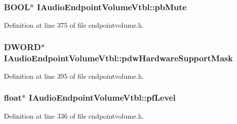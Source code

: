 \subsubsection[{\texorpdfstring{pb\+Mute}{pbMute}}]{ {\bf B\+O\+OL}$\ast$ I\+Audio\+Endpoint\+Volume\+Vtbl\+::pb\+Mute}\hypertarget{struct_i_audio_endpoint_volume_vtbl_ad026f0f9821685c05b061387dde50c48}{}\label{struct_i_audio_endpoint_volume_vtbl_ad026f0f9821685c05b061387dde50c48}


Definition at line 375 of file endpointvolume.\+h.

\subsubsection[{\texorpdfstring{pdw\+Hardware\+Support\+Mask}{pdwHardwareSupportMask}}]{ {\bf D\+W\+O\+RD}$\ast$ I\+Audio\+Endpoint\+Volume\+Vtbl\+::pdw\+Hardware\+Support\+Mask}\hypertarget{struct_i_audio_endpoint_volume_vtbl_ae89acb965aef08a9d5d357fde01b0d9e}{}\label{struct_i_audio_endpoint_volume_vtbl_ae89acb965aef08a9d5d357fde01b0d9e}


Definition at line 395 of file endpointvolume.\+h.

\subsubsection[{\texorpdfstring{pf\+Level}{pfLevel}}]{ float$\ast$ I\+Audio\+Endpoint\+Volume\+Vtbl\+::pf\+Level}\hypertarget{struct_i_audio_endpoint_volume_vtbl_a43938306c0a06c225921a63ba4041f9e}{}\label{struct_i_audio_endpoint_volume_vtbl_a43938306c0a06c225921a63ba4041f9e}


Definition at line 336 of file endpointvolume.\+h.

